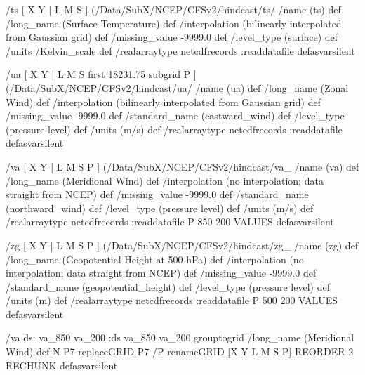 \begin{ingrid}
/ts {
[ X Y | L M S ] (/Data/SubX/NCEP/CFSv2/hindcast/ts/%
/name (ts) def
/long_name (Surface Temperature) def
/interpolation (bilinearly interpolated from Gaussian grid) def
/missing_value -9999.0 def
/level_type (surface) def
/units /Kelvin_scale def
/realarraytype netcdfrecords :readdatafile
} defasvarsilent

/ua {
[ X Y | L M S first 18231.75 subgrid P ] (/Data/SubX/NCEP/CFSv2/hindcast/ua/%
/name (ua) def
/long_name (Zonal Wind) def
/interpolation (bilinearly interpolated from Gaussian grid) def
/missing_value -9999.0 def
/standard_name (eastward_wind) def
/level_type (pressure level) def
/units (m/s) def
/realarraytype netcdfrecords :readdatafile
} defasvarsilent

/va {
[ X Y | L M S P ] (/Data/SubX/NCEP/CFSv2/hindcast/va_%
/name (va) def
/long_name (Meridional Wind) def
/interpolation (no interpolation; data straight from NCEP) def
/missing_value -9999.0 def
/standard_name (northward_wind) def
/level_type (pressure level) def
/units (m/s) def
/realarraytype netcdfrecords :readdatafile
P 850 200 VALUES
} defasvarsilent

/zg {
[ X Y | L M S P ] (/Data/SubX/NCEP/CFSv2/hindcast/zg_%
/name (zg) def
/long_name (Geopotential Height at 500 hPa) def
/interpolation (no interpolation; data straight from NCEP) def
/missing_value -9999.0 def
/standard_name (geopotential_height) def
/level_type (pressure level) def
/units (m) def
/realarraytype netcdfrecords :readdatafile
P 500 200 VALUES
} defasvarsilent

\end{ingrid}
/va {
ds: va_850 va_200 :ds
{ va_850 va_200 } grouptogrid
/long_name (Meridional Wind) def
N P7 replaceGRID
P7 /P renameGRID
[X Y L M S P] REORDER
2 RECHUNK
} defasvarsilent

